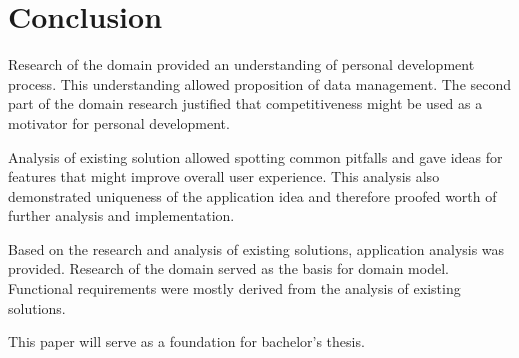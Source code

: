 
\chapter{Conclusion}\label{ch:conclusion}

Research of the domain provided an understanding of personal development process.
This understanding allowed proposition of data management.
The second part of the domain research justified that competitiveness might be used as a motivator for personal development.

Analysis of existing solution allowed spotting common pitfalls and gave ideas for features that might improve overall user experience.
This analysis also demonstrated uniqueness of the application idea and therefore proofed worth of further analysis and implementation.

Based on the research and analysis of existing solutions, application analysis was provided.
Research of the domain served as the basis for domain model.
Functional requirements were mostly derived from the analysis of existing solutions.

This paper will serve as a foundation for bachelor's thesis.